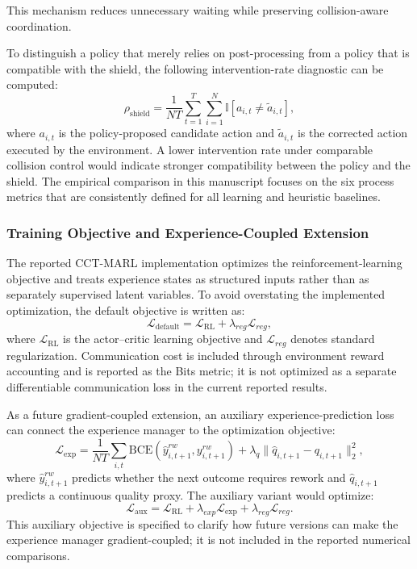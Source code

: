 \documentclass[fleqn,10pt]{wlpeerj}
\begin{document}
This mechanism reduces unnecessary waiting while preserving collision-aware coordination.

To distinguish a policy that merely relies on post-processing from a policy that is compatible with the shield, the following intervention-rate diagnostic can be computed:
\begin{equation}
\rho_{\mathrm{shield}}=\frac{1}{NT}\sum_{t=1}^{T}\sum_{i=1}^{N}\mathbb{I}\left[a_{i,t}\neq \tilde{a}_{i,t}\right],
\label{eq:shield_intervention}
\end{equation}
where $a_{i,t}$ is the policy-proposed candidate action and $\tilde{a}_{i,t}$ is the corrected action executed by the environment. A lower intervention rate under comparable collision control would indicate stronger compatibility between the policy and the shield. The empirical comparison in this manuscript focuses on the six process metrics that are consistently defined for all learning and heuristic baselines.

\subsubsection{Training Objective and Experience-Coupled Extension}

The reported CCT-MARL implementation optimizes the reinforcement-learning objective and treats experience states as structured inputs rather than as separately supervised latent variables. To avoid overstating the implemented optimization, the default objective is written as:
\begin{equation}
\mathcal{L}_{\mathrm{default}}=\mathcal{L}_{\mathrm{RL}}+\lambda_{reg}\mathcal{L}_{reg},
\end{equation}
where $\mathcal{L}_{\mathrm{RL}}$ is the actor--critic learning objective and $\mathcal{L}_{reg}$ denotes standard regularization. Communication cost is included through environment reward accounting and is reported as the Bits metric; it is not optimized as a separate differentiable communication loss in the current reported results.

As a future gradient-coupled extension, an auxiliary experience-prediction loss can connect the experience manager to the optimization objective:
\begin{equation}
\mathcal{L}_{\mathrm{exp}}=\frac{1}{NT}\sum_{i,t}\mathrm{BCE}(\hat{y}^{rw}_{i,t+1},y^{rw}_{i,t+1})+\lambda_q\lVert \hat{q}_{i,t+1}-q_{i,t+1}\rVert_2^2,
\label{eq:exp_aux_loss}
\end{equation}
where $\hat{y}^{rw}_{i,t+1}$ predicts whether the next outcome requires rework and $\hat{q}_{i,t+1}$ predicts a continuous quality proxy. The auxiliary variant would optimize:
\begin{equation}
\mathcal{L}_{\mathrm{aux}}=\mathcal{L}_{\mathrm{RL}}+\lambda_{exp}\mathcal{L}_{\mathrm{exp}}+\lambda_{reg}\mathcal{L}_{reg}.
\end{equation}
This auxiliary objective is specified to clarify how future versions can make the experience manager gradient-coupled; it is not included in the reported numerical comparisons.
\end{document}
